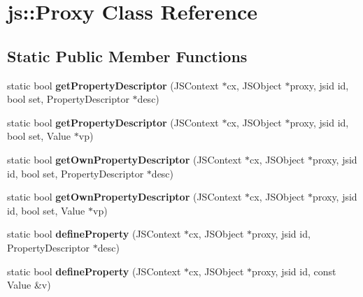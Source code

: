\hypertarget{classjs_1_1_proxy}{\section{js\-:\-:Proxy Class Reference}
\label{classjs_1_1_proxy}
}
\subsection*{Static Public Member Functions}
\begin{DoxyCompactItemize}
\item 
\hypertarget{classjs_1_1_proxy_aee8491e10a3ee9bd2fa47fc351f0bb33}{static bool {\bfseries get\-Property\-Descriptor} (J\-S\-Context $\ast$cx, J\-S\-Object $\ast$proxy, jsid id, bool set, Property\-Descriptor $\ast$desc)}\label{classjs_1_1_proxy_aee8491e10a3ee9bd2fa47fc351f0bb33}

\item 
\hypertarget{classjs_1_1_proxy_a15fcecf3397c5135fc502822c99232e0}{static bool {\bfseries get\-Property\-Descriptor} (J\-S\-Context $\ast$cx, J\-S\-Object $\ast$proxy, jsid id, bool set, Value $\ast$vp)}\label{classjs_1_1_proxy_a15fcecf3397c5135fc502822c99232e0}

\item 
\hypertarget{classjs_1_1_proxy_a3a9d3c7487c3c487afa4eb3c6b1d0a36}{static bool {\bfseries get\-Own\-Property\-Descriptor} (J\-S\-Context $\ast$cx, J\-S\-Object $\ast$proxy, jsid id, bool set, Property\-Descriptor $\ast$desc)}\label{classjs_1_1_proxy_a3a9d3c7487c3c487afa4eb3c6b1d0a36}

\item 
\hypertarget{classjs_1_1_proxy_a8c47be50567cc9510e7a186a068b561c}{static bool {\bfseries get\-Own\-Property\-Descriptor} (J\-S\-Context $\ast$cx, J\-S\-Object $\ast$proxy, jsid id, bool set, Value $\ast$vp)}\label{classjs_1_1_proxy_a8c47be50567cc9510e7a186a068b561c}

\item 
\hypertarget{classjs_1_1_proxy_a6e18e5578e59dbe090c34550827ba8d8}{static bool {\bfseries define\-Property} (J\-S\-Context $\ast$cx, J\-S\-Object $\ast$proxy, jsid id, Property\-Descriptor $\ast$desc)}\label{classjs_1_1_proxy_a6e18e5578e59dbe090c34550827ba8d8}

\item 
\hypertarget{classjs_1_1_proxy_a6c30733851f7366ee274d5bb225cc237}{static bool {\bfseries define\-Property} (J\-S\-Context $\ast$cx, J\-S\-Object $\ast$proxy, jsid id, const Value \&v)}\label{classjs_1_1_proxy_a6c30733851f7366ee274d5bb225cc237}


\end{DoxyCompactItemize}
